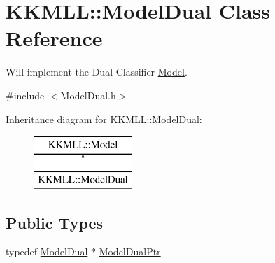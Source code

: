 \hypertarget{class_k_k_m_l_l_1_1_model_dual}{}\section{K\+K\+M\+LL\+:\+:Model\+Dual Class Reference}
\label{class_k_k_m_l_l_1_1_model_dual}


Will implement the Dual Classifier \hyperlink{class_k_k_m_l_l_1_1_model}{Model}.  




{\ttfamily \#include $<$Model\+Dual.\+h$>$}

Inheritance diagram for K\+K\+M\+LL\+:\+:Model\+Dual\+:\begin{figure}[H]
\begin{center}
\leavevmode
\includegraphics[height=2.000000cm]{class_k_k_m_l_l_1_1_model_dual}
\end{center}
\end{figure}
\subsection*{Public Types}
\begin{DoxyCompactItemize}
\item 
typedef \hyperlink{class_k_k_m_l_l_1_1_model_dual}{Model\+Dual} $\ast$ \hyperlink{class_k_k_m_l_l_1_1_model_dual_aa5c30e12d0d4eeed91d9fafc858544f4}{Model\+Dual\+Ptr}
\end{DoxyCompactItemize}
